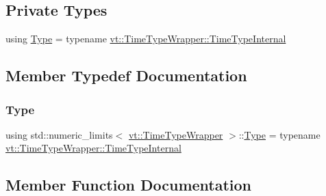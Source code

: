\subsection*{Private Types}
\begin{DoxyCompactItemize}
\item 
using \hyperlink{classstd_1_1numeric__limits_3_01vt_1_1_time_type_wrapper_01_4_a526c56eceab4b7b9576d3f9d11d3dd38}{Type} = typename \hyperlink{structvt_1_1_time_type_wrapper_a932f8d925e6c43e898fb8761ea667ef1}{vt\+::\+Time\+Type\+Wrapper\+::\+Time\+Type\+Internal}
\end{DoxyCompactItemize}


\subsection{Member Typedef Documentation}
\mbox{\label{classstd_1_1numeric__limits_3_01vt_1_1_time_type_wrapper_01_4_a526c56eceab4b7b9576d3f9d11d3dd38}} 
\subsubsection{\texorpdfstring{Type}{Type}}
{\footnotesize\ttfamily using std\+::numeric\+\_\+limits$<$ \hyperlink{structvt_1_1_time_type_wrapper}{vt\+::\+Time\+Type\+Wrapper} $>$\+::\hyperlink{classstd_1_1numeric__limits_3_01vt_1_1_time_type_wrapper_01_4_a526c56eceab4b7b9576d3f9d11d3dd38}{Type} =  typename \hyperlink{structvt_1_1_time_type_wrapper_a932f8d925e6c43e898fb8761ea667ef1}{vt\+::\+Time\+Type\+Wrapper\+::\+Time\+Type\+Internal}\hspace{0.3cm}{\ttfamily [private]}}



\subsection{Member Function Documentation}
\mbox{\label{classstd_1_1numeric__limits_3_01vt_1_1_time_type_wrapper_01_4_a4cd83330ab57b16a325f7615c297cde7}} 
